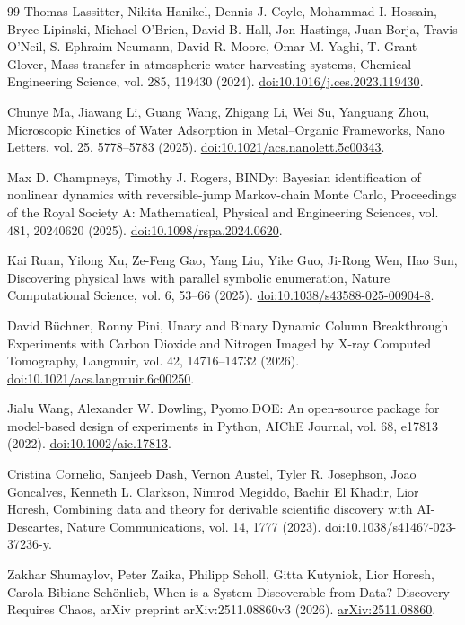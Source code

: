 \begin{thebibliography}{99}
 Thomas Lassitter, Nikita Hanikel, Dennis J. Coyle, Mohammad I. Hossain, Bryce Lipinski, Michael O'Brien, David B. Hall, Jon Hastings, Juan Borja, Travis O'Neil, S. Ephraim Neumann, David R. Moore, Omar M. Yaghi, T. Grant Glover, Mass transfer in atmospheric water harvesting systems, Chemical Engineering Science, vol. 285, 119430 (2024). \href{https://doi.org/10.1016/j.ces.2023.119430}{doi:10.1016/j.ces.2023.119430}.

 Chunye Ma, Jiawang Li, Guang Wang, Zhigang Li, Wei Su, Yanguang Zhou, Microscopic Kinetics of Water Adsorption in Metal--Organic Frameworks, Nano Letters, vol. 25, 5778--5783 (2025). \href{https://doi.org/10.1021/acs.nanolett.5c00343}{doi:10.1021/acs.nanolett.5c00343}.

 Max D. Champneys, Timothy J. Rogers, BINDy: Bayesian identification of nonlinear dynamics with reversible-jump Markov-chain Monte Carlo, Proceedings of the Royal Society A: Mathematical, Physical and Engineering Sciences, vol. 481, 20240620 (2025). \href{https://doi.org/10.1098/rspa.2024.0620}{doi:10.1098/rspa.2024.0620}.

 Kai Ruan, Yilong Xu, Ze-Feng Gao, Yang Liu, Yike Guo, Ji-Rong Wen, Hao Sun, Discovering physical laws with parallel symbolic enumeration, Nature Computational Science, vol. 6, 53--66 (2025). \href{https://doi.org/10.1038/s43588-025-00904-8}{doi:10.1038/s43588-025-00904-8}.

 David B\"{u}chner, Ronny Pini, Unary and Binary Dynamic Column Breakthrough Experiments with Carbon Dioxide and Nitrogen Imaged by X-ray Computed Tomography, Langmuir, vol. 42, 14716--14732 (2026). \href{https://doi.org/10.1021/acs.langmuir.6c00250}{doi:10.1021/acs.langmuir.6c00250}.

 Jialu Wang, Alexander W. Dowling, Pyomo.DOE: An open-source package for model-based design of experiments in Python, AIChE Journal, vol. 68, e17813 (2022). \href{https://doi.org/10.1002/aic.17813}{doi:10.1002/aic.17813}.

 Cristina Cornelio, Sanjeeb Dash, Vernon Austel, Tyler R. Josephson, Joao Goncalves, Kenneth L. Clarkson, Nimrod Megiddo, Bachir El Khadir, Lior Horesh, Combining data and theory for derivable scientific discovery with AI-Descartes, Nature Communications, vol. 14, 1777 (2023). \href{https://doi.org/10.1038/s41467-023-37236-y}{doi:10.1038/s41467-023-37236-y}.

 Zakhar Shumaylov, Peter Zaika, Philipp Scholl, Gitta Kutyniok, Lior Horesh, Carola-Bibiane Sch\"{o}nlieb, When is a System Discoverable from Data? Discovery Requires Chaos, arXiv preprint arXiv:2511.08860v3 (2026). \href{https://arxiv.org/abs/2511.08860}{arXiv:2511.08860}.


\end{thebibliography}
